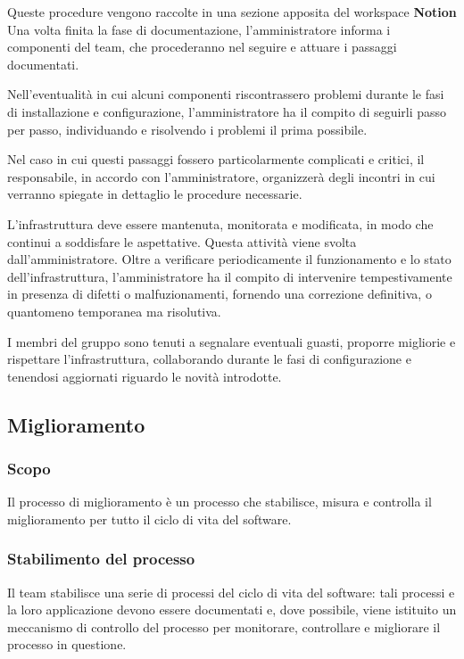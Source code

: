 \documentclass[10pt, a4paper]{article}
\begin{document}
Queste procedure vengono raccolte in una sezione apposita del workspace \textbf{Notion}
Una volta finita la fase di documentazione, l'amministratore informa i componenti del team, che procederanno nel seguire e attuare i passaggi documentati.

Nell'eventualità in cui alcuni componenti riscontrassero problemi durante le fasi di installazione e configurazione, l'amministratore ha il compito di seguirli passo per passo, individuando e risolvendo i problemi il prima possibile.

Nel caso in cui questi passaggi fossero particolarmente complicati e critici, il responsabile, in accordo con l'amministratore, organizzerà degli incontri in cui verranno spiegate in dettaglio le procedure necessarie.

L'infrastruttura deve essere mantenuta, monitorata e modificata, in modo che continui a soddisfare le aspettative.
Questa attività viene svolta dall'amministratore.
Oltre a verificare periodicamente il funzionamento e lo stato dell'infrastruttura, l'amministratore ha il compito di intervenire tempestivamente in presenza di difetti o malfuzionamenti, fornendo una correzione definitiva, o quantomeno temporanea ma risolutiva.

I membri del gruppo sono tenuti a segnalare eventuali guasti, proporre migliorie e rispettare l'infrastruttura, collaborando durante le fasi di configurazione e tenendosi aggiornati riguardo le novità introdotte.

\subsection{Miglioramento}
\subsubsection{Scopo}
Il processo di miglioramento è un processo che stabilisce, misura e controlla il miglioramento per tutto il ciclo di vita del software. 

\subsubsection{Stabilimento del processo}
Il team stabilisce una serie di processi del ciclo di vita del software: tali processi e la loro applicazione devono essere documentati e, 
dove possibile, viene istituito un meccanismo di controllo del processo per monitorare, controllare e migliorare il processo in questione.
\end{document}
